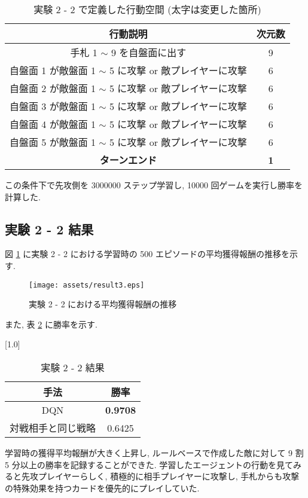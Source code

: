 \documentclass{jarticle}     %
\begin{document}
\begin{table}[h]
  \centering
  \caption{実験 2 - 2 で定義した行動空間 (太字は変更した箇所)}
  \label{table:action2-2}
  \begin{tabular}{|c|c|}
  \hline
  行動説明                          & 次元数        \\ \hline
  手札 1 $\sim$ 9 を自盤面に出す             & 9          \\ \hline
  自盤面 1 が敵盤面 1 $\sim$ 5 に攻撃 or 敵プレイヤーに攻撃    & 6          \\ \hline
  自盤面 2 が敵盤面 1 $\sim$ 5 に攻撃 or 敵プレイヤーに攻撃    & 6   \\ \hline
  自盤面 3 が敵盤面 1 $\sim$ 5 に攻撃 or 敵プレイヤーに攻撃    & 6\\ \hline
  自盤面 4 が敵盤面 1 $\sim$ 5 に攻撃 or 敵プレイヤーに攻撃    & 6 \\ \hline
  自盤面 5 が敵盤面 1 $\sim$ 5 に攻撃 or 敵プレイヤーに攻撃    & 6\\ \hline
  \textbf{ターンエンド} & \textbf{1} \\ \hline
  \end{tabular}
  \end{table}

  この条件下で先攻側を 3000000 ステップ学習し, 10000 回ゲームを実行し勝率を計算した.

\subsection{実験 2 - 2 結果}
図 \ref{fig:result2-2} に実験 2 - 2 における学習時の 500 エピソードの平均獲得報酬の推移を示す.
  \begin{figure}[h]
    \centering
    \texttt{[image: assets/result3.eps]}
    \caption{実験 2 - 2 における平均獲得報酬の推移}
    \label{fig:result2-2}
  \end{figure}

また, 表 \ref{table:result2-2} に勝率を示す.

\begin{table}[t]
  \centering
  \caption{実験 2 - 2 結果}
  \vspace{-0.3cm}
  \label{table:result2-2}
  \scalebox{1.0}[1.0]{
    \begin{tabular}{|c|c|}
      \hline
      手法 & 勝率 \\ \hline
      DQN & \textbf{0.9708} \\ \hline
      対戦相手と同じ戦略 & 0.6425 \\ \hline

      \end{tabular}
  }
  \end{table}
学習時の獲得平均報酬が大きく上昇し, ルールベースで作成した敵に対して 9 割 5 分以上の勝率を記録することができた.
学習したエージェントの行動を見てみると先攻プレイヤーらしく, 積極的に相手プレイヤーに攻撃し, 手札からも攻撃の特殊効果を持つカードを優先的にプレイしていた.
\end{document}
